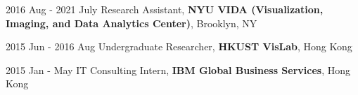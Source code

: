 2016 Aug - 2021 July \hspace{1mm} 
Research Assistant, \textbf{NYU VIDA (Visualization, Imaging, and Data Analytics Center)}, Brooklyn, NY

2015 Jun - 2016 Aug \hspace{1.5mm}
Undergraduate Researcher, \textbf{HKUST VisLab}, Hong Kong



2015 Jan - May \hspace{10mm} 
IT Consulting Intern, \textbf{IBM Global Business Services}, Hong Kong

